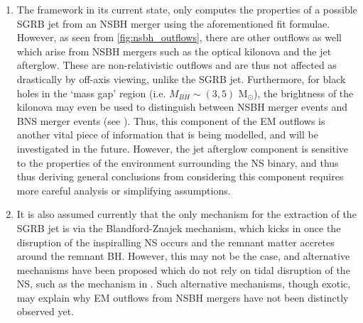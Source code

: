 \begin{enumerate}
            \item The framework in its current state, only computes the properties of
                a possible SGRB jet from an NSBH merger using the aforementioned fit
                formulae. However, as seen from \ref{fig:nsbh_outflows}, there are other
                outflows as well which arise from NSBH mergers such as the optical
                kilonova and the jet afterglow. These are non-relativistic outflows and
                are thus not affected as drastically by off-axis viewing, unlike the
                SGRB jet. Furthermore, for black holes in the `mass gap' region (i.e.
                $M_{BH} \sim (3, 5)$ M$_\odot$), the brightness of the kilonova may even
                be used to distinguish between NSBH merger events and BNS merger events
                (see \cite{barbieri_2019b}). Thus, this component of the EM outflows is
                another vital piece of information that is being modelled, and will be
                investigated in the future. However, the jet afterglow component is
                sensitive to the properties of the environment surrounding the NS
                binary, and thus thus deriving general conclusions from considering this
                component requires more careful analysis or simplifying assumptions.

            \item It is also assumed currently that the only mechanism for the
                extraction of the SGRB jet is via the Blandford-Znajek mechanism, which
                kicks in once the disruption of the inspiralling NS occurs and the
                remnant matter accretes around the remnant BH. However, this may not be
                the case, and alternative mechanisms have been proposed which do not
                rely on tidal disruption of the NS, such as the mechanism in
                \cite{east_2021}. Such alternative mechanisms, though exotic, may
                explain why EM outflows from NSBH mergers have not been distinctly
                observed yet.


\end{enumerate}
